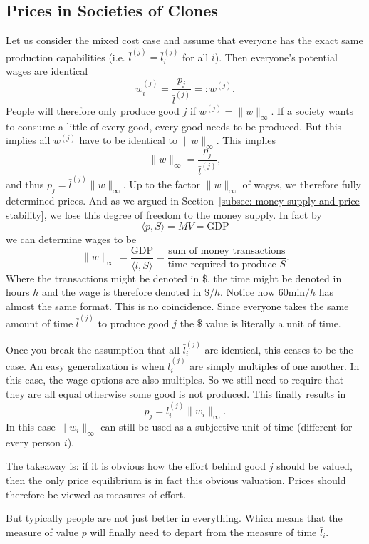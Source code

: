 \subsection{Prices in Societies of Clones}

Let us consider the mixed cost case and assume that everyone has the exact same
production capabilities (i.e. \(\bar{l}^{(j)} = \bar{l}_i^{(j)}\) for all
\(i\)). Then everyone's potential wages are identical
\[
	w_i^{(j)} = \frac{p_j}{\bar{l}^{(j)}} =: w^{(j)}.
\]
People will therefore only produce good \(j\) if \(w^{(j)} = \| w\|_\infty\).
If a society wants to consume a little of every good, every good needs to be
produced. But this implies all \(w^{(j)}\) have to be identical to
\(\|w\|_\infty\). This implies
\[
	\|w\|_\infty = \frac{p_j}{\bar{l}^{(j)}},
\]
and thus \(p_j = \bar{l}^{(j)}\|w\|_\infty\). Up to the factor \(\|w\|_\infty\)
of wages, we therefore fully determined prices. And as we argued in
Section~\ref{subsec: money supply and price stability}, we lose this degree of
freedom to the money supply. In fact by
\[
	\langle p, S\rangle = MV = \text{GDP}
\]
we can determine wages to be
\[
	\|w\|_\infty = \frac{\text{GDP}}{\langle \bar{l}, S\rangle}
	= \frac{\text{sum of money transactions}}{\text{time required to produce }S}.
\]
Where the transactions might be denoted in \$, the time might be denoted in
hours \(h\) and the wage is therefore denoted in \(\$/h\). Notice how
\(60 \text{min}/h\) has almost the same format. This is no coincidence. Since
everyone takes the same amount of time \(\bar{l}^{(j)}\) to produce good \(j\)
the \(\$\) value is literally a unit of time.

Once you break the assumption that all \(\bar{l}_i^{(j)}\) are identical, this
ceases to be the case. An easy generalization is when \(\bar{l}_i^{(j)}\) are
simply multiples of one another. In this case, the wage options are also
multiples. So we still need to require that they are all equal otherwise some 
good is not produced. This finally results in
\[
	p_j = \bar{l}_i^{(j)}\|w_i\|_\infty.
\]
In this case \(\|w_i\|_\infty\) can still be used as a subjective unit of time
(different for every person \(i\)).

The takeaway is: if it is obvious how the effort behind good \(j\) should be
valued, then the only price equilibrium is in fact this obvious valuation.
Prices should therefore be viewed as measures of effort.

But typically people are not just better in everything. Which means that the
measure of value \(p\) will finally need to depart from the measure of time
\(\bar{l}_i\).
